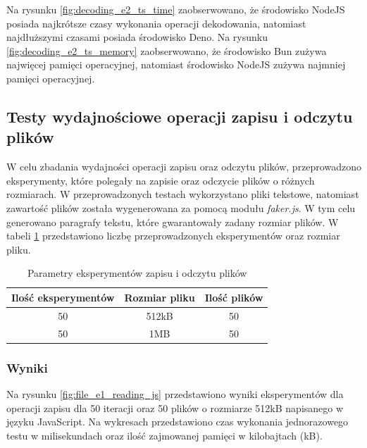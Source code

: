 Na rysunku \ref{fig:decoding_e2_ts_time} zaobserwowano, że środowisko NodeJS posiada najkrótsze czasy wykonania operacji dekodowania, natomiast najdłuższymi czasami posiada środowisko Deno. Na rysunku \ref{fig:decoding_e2_ts_memory} zaobserwowano, że środowisko Bun zużywa najwięcej pamięci operacyjnej, natomiast środowisko NodeJS zużywa najmniej pamięci operacyjnej.

\subsection{Testy wydajnościowe operacji zapisu i odczytu plików}
W celu zbadania wydajności operacji zapisu oraz odczytu plików, przeprowadzono eksperymenty, które polegały na zapisie oraz odczycie plików o różnych rozmiarach. W przeprowadzonych testach wykorzystano pliki tekstowe, natomiast zawartość plików została wygenerowana za pomocą modułu \textit{faker.js}. W tym celu generowano paragrafy tekstu, które gwarantowały zadany rozmiar plików. W tabeli \ref{tab:file_experiments} przedstawiono liczbę przeprowadzonych eksperymentów oraz rozmiar pliku.

\begin{table}[H]
  \centering
  \caption{Parametry eksperymentów zapisu i odczytu plików}
  \begin{tabular}{|c|c|c|}
    \hline
    \textbf{Ilość eksperymentów} & \textbf{Rozmiar pliku} & \textbf{Ilość plików} \\ \hline
    50 & 512kB & 50 \\ \hline
    50 & 1MB & 50 \\ \hline
  \end{tabular}
  \label{tab:file_experiments}
\end{table}

\subsubsection{Wyniki}
Na rysunku \ref{fig:file_e1_reading_js} przedstawiono wyniki eksperymentów dla operacji zapisu dla 50 iteracji oraz 50 plików o rozmiarze 512kB napisanego w języku JavaScript. Na wykresach przedstawiono czas wykonania jednorazowego testu w milisekundach oraz ilość zajmowanej pamięci w kilobajtach (kB).


